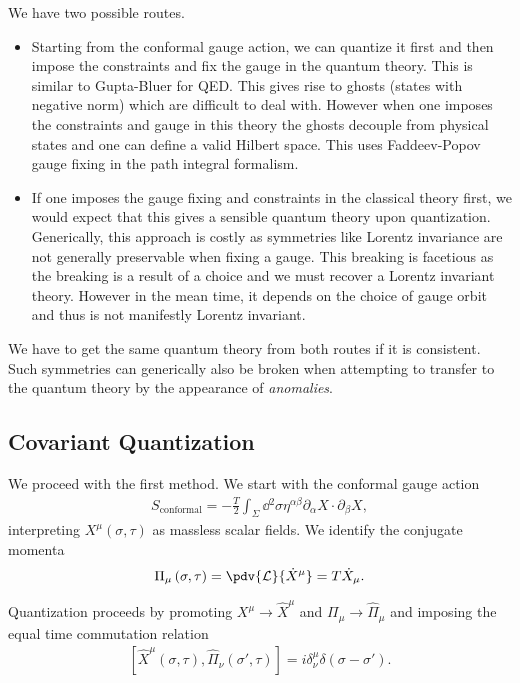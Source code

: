 We have two possible routes. 
\begin{itemize}
    \item Starting from the conformal gauge action, we can quantize it first and then impose the constraints and fix the gauge in the quantum theory. This is similar to Gupta-Bluer for QED. This gives rise to ghosts (states with negative norm) which are difficult to deal with. However when one imposes the constraints and gauge in this theory the ghosts decouple from physical states and one can define a valid Hilbert space. This uses Faddeev-Popov gauge fixing in the path integral formalism.
    \item If one imposes the gauge fixing and constraints in the classical theory first, we would expect that this gives a sensible quantum theory upon quantization. Generically, this approach is costly as symmetries like Lorentz invariance are not generally preservable when fixing a gauge. This breaking is facetious as the breaking is a result of a choice and we must recover a Lorentz invariant theory. However in the mean time, it depends on the choice of gauge orbit and thus is not manifestly Lorentz invariant.
\end{itemize}

We have to get the same quantum theory from both routes if it is consistent. Such symmetries can generically also be broken when attempting to transfer to the quantum theory by the appearance of \emph{anomalies}.

\subsection{Covariant Quantization}

We proceed with the first method. We start with the conformal gauge action
\begin{align}
    S_\text{conformal} = -\frac{T}{2} \int_\Sigma \dd{^2 \sigma} \eta^{\alpha \beta} \partial_\alpha X \cdot \partial_\beta X
,\end{align}
interpreting $X^{\mu}\left( \sigma, \tau \right) $ as massless scalar fields. We identify the conjugate momenta
\begin{align}
    \Pi_\mu \left( \sigma, \tau \right) = \pdv{\mathcal{L}}{\dot{X}^{\mu}} = T \dot{X}_\mu
.\end{align}

Quantization proceeds by promoting $X^{\mu} \to \hat{X}^{\mu}$ and $\Pi_\mu \to \hat{\Pi}_\mu$ and imposing the equal time commutation relation
\begin{align}
    \left[ \hat{X}^{\mu}\left( \sigma, \tau \right) , \hat{\Pi}_\nu \left( \sigma' , \tau \right) \right] = i \delta^{\mu}_\nu \delta\left( \sigma - \sigma' \right)
.\end{align}

